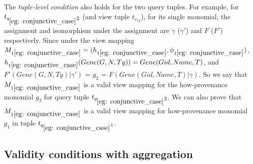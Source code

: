 \begin{example}
The {\em tuple-level condition} also holds for the two query tuples. For example, for $t_{q_{\ref{eg: conjunctive_case}}2}$ (and view tuple $t_{v_12}$), for its single monomial, the assignment and isomorphism under the assignment are $\gamma$ ($\gamma'$) and $F$ ($F'$) respectively. Since under the view mapping $M_{1\ref{eg: conjunctive_case}}=(h_{1\ref{eg: conjunctive_case}}, \phi_{1\ref{eg: conjunctive_case}})$, $h_{1\ref{eg: conjunctive_case}}(Gene(G, N, Ty)) = Gene(Gid, Name, T)$, and $F'(Gene(G, N, Ty)|\gamma')$ = $g_2$ = $F(Gene(Gid, Name, T)| \gamma)$. So we say that $M_{1\ref{eg: conjunctive_case}}$ is a valid view mapping for the how-provenance monomial $g_2$ for query tuple $t_{q_{\ref{eg: conjunctive_case}}2}$. We can also prove that $M_{1\ref{eg: conjunctive_case}}$ is a valid view mapping for how-provenance monomial $g_1$ in tuple $t_{q_{\ref{eg: conjunctive_case}}1}$.



\end{example}



\subsection{Validity conditions with aggregation}\label{valid_condition_agg}

